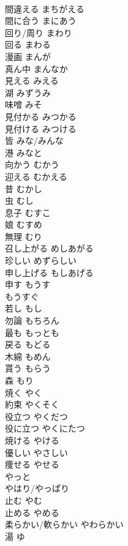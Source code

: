 \documentclass[8pt]{extreport}
\begin{document}
\begin{CJK}{UTF8}{min}
\\	間違える	まちがえる	
\\	間に合う	まにあう	
\\	回り/周り	まわり	
\\	回る	まわる	
\\	漫画	まんが	
\\	真ん中	まんなか	
\\	見える	みえる	
\\	湖	みずうみ	
\\	味噌	みそ	
\\	見付かる	みつかる	
\\	見付ける	みつける	
\\	皆	みな/みんな	
\\	港	みなと	
\\	向かう	むかう	
\\	迎える	むかえる	
\\	昔	むかし	
\\	虫	むし	
\\	息子	むすこ	
\\	娘	むすめ	
\\	無理	むり	
\\	召し上がる	めしあがる	
\\	珍しい	めずらしい	
\\	申し上げる	もしあげる	
\\	申す	もうす	
\\	もうすぐ		
\\	若し	もし	
\\	勿論	もちろん	
\\	最も	もっとも	
\\	戻る	もどる	
\\	木綿	もめん	
\\	貰う	もらう	
\\	森	もり	
\\	焼く	やく	
\\	約束	やくそく	
\\	役立つ	やくだつ	
\\	役に立つ	やくにたつ	
\\	焼ける	やける	
\\	優しい	やさしい	
\\	痩せる	やせる	
\\	やっと		
\\	やはり/やっぱり		
\\	止む	やむ	
\\	止める	やめる	
\\	柔らかい/軟らかい	やわらかい	
\\	湯	ゆ	

\end{CJK}
\end{document}
